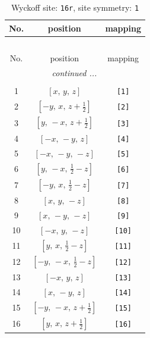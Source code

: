 \documentclass[fleqn,8pt]{jsarticle}
\begin{document}
\begin{longtable}{ccc}
\caption{Wyckoff site: {\tt 16r}, site symmetry: {\tt 1}}
 \\
 \hline \hline
No. & position & mapping \\ \hline \endfirsthead

\multicolumn{2}{l}{\tablename\ \thetable{}} \\
 \hline \hline
No. & position & mapping \\ \hline \endhead

 \hline \hline
\multicolumn{2}{r}{\footnotesize\it continued ...} \\ \endfoot

 \hline \hline
\multicolumn{2}{r}{} \\ \endlastfoot

1 & $\left[ x,\, y,\, z \right]$ & {\tt [1]} \\ \hline
2 & $\left[ - y,\, x,\, z + \frac{1}{2} \right]$ & {\tt [2]} \\ \hline
3 & $\left[ y,\, - x,\, z + \frac{1}{2} \right]$ & {\tt [3]} \\ \hline
4 & $\left[ - x,\, - y,\, z \right]$ & {\tt [4]} \\ \hline
5 & $\left[ - x,\, - y,\, - z \right]$ & {\tt [5]} \\ \hline
6 & $\left[ y,\, - x,\, \frac{1}{2} - z \right]$ & {\tt [6]} \\ \hline
7 & $\left[ - y,\, x,\, \frac{1}{2} - z \right]$ & {\tt [7]} \\ \hline
8 & $\left[ x,\, y,\, - z \right]$ & {\tt [8]} \\ \hline
9 & $\left[ x,\, - y,\, - z \right]$ & {\tt [9]} \\ \hline
10 & $\left[ - x,\, y,\, - z \right]$ & {\tt [10]} \\ \hline
11 & $\left[ y,\, x,\, \frac{1}{2} - z \right]$ & {\tt [11]} \\ \hline
12 & $\left[ - y,\, - x,\, \frac{1}{2} - z \right]$ & {\tt [12]} \\ \hline
13 & $\left[ - x,\, y,\, z \right]$ & {\tt [13]} \\ \hline
14 & $\left[ x,\, - y,\, z \right]$ & {\tt [14]} \\ \hline
15 & $\left[ - y,\, - x,\, z + \frac{1}{2} \right]$ & {\tt [15]} \\ \hline
16 & $\left[ y,\, x,\, z + \frac{1}{2} \right]$ & {\tt [16]} \\
\end{longtable}
\end{document}

